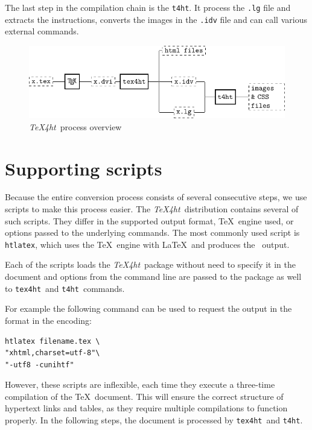 \documentclass{ltugproc}
\newcommand\term[1]{\textit{#1}}
\newcommand\command[1]{\texttt{#1}}
\newcommand\texfourht{\term{\TeX\-4ht}}
\newcommand\texfourhtcmd{\command{tex4ht}}
\newcommand\tfourhtcmd{\command{t4ht}}
\newcommand\extension[1]{\texttt{.#1}}
\begin{document}
The last step in the compilation chain is the \tfourhtcmd.
It process the \extension{lg} file and extracts the  instructions,
converts the images in the \extension{idv} file and can call various external
commands.


\begin{figure}[hbt!]
  \includegraphics[width=\textwidth]{img/tex4ht_process.pdf}
\caption{\texfourht\ process overview}
\label{fig:overview}
\end{figure}

\section{Supporting scripts}

Because the entire conversion process consists of several consecutive steps,
we use scripts to make this process easier. The \texfourht\ distribution
contains several of such scripts. They differ in the supported output format, 
\TeX\ engine used, or options passed to the underlying commands.
The most commonly used script  is \command{htlatex}, which uses the \PDF\TeX\ engine with
\LaTeX\ and produces the \HTML\ output. 

Each of the scripts loads the \texfourht\ package without need to specify it in
the document and options from the command line are passed to the package as well to
\texfourhtcmd\ and \tfourhtcmd\ commands.

For example the following command can be used to request the output in the
 format in the  encoding:

\begin{verbatim}
htlatex filename.tex \
"xhtml,charset=utf-8"\
"-utf8 -cunihtf"
\end{verbatim}

However, these scripts are inflexible, each time they execute a three-time
compilation of the \TeX\  document. This will ensure the correct structure of
hypertext links and tables, as they require multiple compilations to
function properly. In the following steps, the document is processed by
\texfourhtcmd\ and \tfourhtcmd. 
\end{document}
